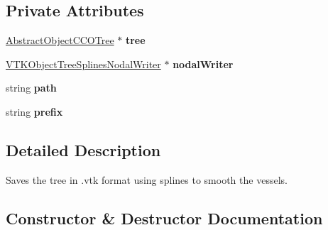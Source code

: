 \subsection*{Private Attributes}
\begin{DoxyCompactItemize}
\item 
\hyperlink{class_abstract_object_c_c_o_tree}{Abstract\+Object\+C\+C\+O\+Tree} $\ast$ {\bfseries tree}\hypertarget{class_visualization_saving_task_adee46d7131ba48c77b94078be56eb0a9}{}\label{class_visualization_saving_task_adee46d7131ba48c77b94078be56eb0a9}

\item 
\hyperlink{class_v_t_k_object_tree_splines_nodal_writer}{V\+T\+K\+Object\+Tree\+Splines\+Nodal\+Writer} $\ast$ {\bfseries nodal\+Writer}\hypertarget{class_visualization_saving_task_ad84e3ab76408fb38372c274152f3fe10}{}\label{class_visualization_saving_task_ad84e3ab76408fb38372c274152f3fe10}

\item 
string {\bfseries path}\hypertarget{class_visualization_saving_task_afc36a4bf258c35bf97653dfd8e07bf29}{}\label{class_visualization_saving_task_afc36a4bf258c35bf97653dfd8e07bf29}

\item 
string {\bfseries prefix}\hypertarget{class_visualization_saving_task_a24bc1b701fcf209b4458f8fc5c988c10}{}\label{class_visualization_saving_task_a24bc1b701fcf209b4458f8fc5c988c10}

\end{DoxyCompactItemize}


\subsection{Detailed Description}
Saves the tree in .vtk format using splines to smooth the vessels. 

\subsection{Constructor \& Destructor Documentation}
